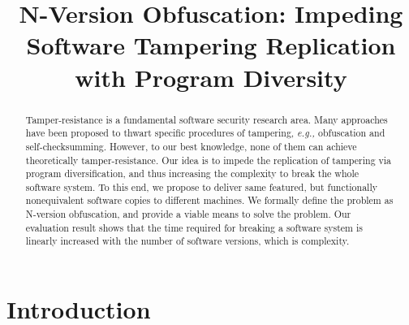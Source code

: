 \documentclass[10pt, conference]{IEEEtran}
\begin{document}
\title{N-Version Obfuscation: Impeding Software Tampering Replication with Program Diversity}

\author{
}

\maketitle

\thispagestyle{plain}

\begin{abstract}

Tamper-resistance is a fundamental software security research area.  Many approaches have been proposed to thwart specific procedures of tampering, \textit{e.g.,} obfuscation and self-checksumming.  However, to our best knowledge, none of them can achieve theoretically tamper-resistance.  Our idea is to impede the replication of tampering via program diversification, and thus increasing the complexity to break the whole software system.  To this end, we propose to deliver same featured, but functionally nonequivalent software copies to different machines.  We formally define the problem as N-version obfuscation, and provide a viable means to solve the problem.  Our evaluation result shows that the time required for breaking a software system is linearly increased with the number of software versions, which is  complexity.  

\end{abstract}

\section{Introduction}
\end{document}
